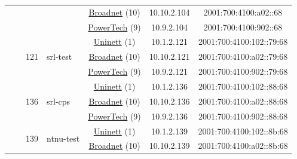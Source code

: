 \begin{small}
\begin{center}
\begin{longtable}{|c|c|c|c|c|c|c|c|}
  &  & \multicolumn{2}{|c|}{} & \multicolumn{2}{|c|}{\tiny{\href{https://www.broadnet.no}{Broadnet} (10)}} & \tiny{10.10.2.104} & \tiny{2001:700:4100:a02::68} \\* \cline{5-5}\cline{6-6}\cline{7-7}\cline{8-8}
  &  & \multicolumn{2}{|c|}{} & \multicolumn{2}{|c|}{\tiny{\href{http://www.powertech.no}{PowerTech} (9)}} & \tiny{10.9.2.104} & \tiny{2001:700:4100:902::68} \\* \cline{3-3}\cline{4-4}\cline{5-5}\cline{6-6}\cline{7-7}\cline{8-8}
  &  & \multirow{3}{*}{\tiny{121}} & \multicolumn{1}{|l|}{\multirow{3}{*}{\tiny{srl-test}}} & \multicolumn{2}{|c|}{\tiny{\href{https://www.uninett.no}{Uninett} (1)}} & \tiny{10.1.2.121} & \tiny{2001:700:4100:102::79:68} \\* \cline{5-5}\cline{6-6}\cline{7-7}\cline{8-8}
  &  &  &  & \multicolumn{2}{|c|}{\tiny{\href{https://www.broadnet.no}{Broadnet} (10)}} & \tiny{10.10.2.121} & \tiny{2001:700:4100:a02::79:68} \\* \cline{5-5}\cline{6-6}\cline{7-7}\cline{8-8}
  &  &  &  & \multicolumn{2}{|c|}{\tiny{\href{http://www.powertech.no}{PowerTech} (9)}} & \tiny{10.9.2.121} & \tiny{2001:700:4100:902::79:68} \\* \cline{3-3}\cline{4-4}\cline{5-5}\cline{6-6}\cline{7-7}\cline{8-8}
  &  & \multirow{3}{*}{\tiny{136}} & \multicolumn{1}{|l|}{\multirow{3}{*}{\tiny{srl-cps}}} & \multicolumn{2}{|c|}{\tiny{\href{https://www.uninett.no}{Uninett} (1)}} & \tiny{10.1.2.136} & \tiny{2001:700:4100:102::88:68} \\* \cline{5-5}\cline{6-6}\cline{7-7}\cline{8-8}
  &  &  &  & \multicolumn{2}{|c|}{\tiny{\href{https://www.broadnet.no}{Broadnet} (10)}} & \tiny{10.10.2.136} & \tiny{2001:700:4100:a02::88:68} \\* \cline{5-5}\cline{6-6}\cline{7-7}\cline{8-8}
  &  &  &  & \multicolumn{2}{|c|}{\tiny{\href{http://www.powertech.no}{PowerTech} (9)}} & \tiny{10.9.2.136} & \tiny{2001:700:4100:902::88:68} \\* \cline{3-3}\cline{4-4}\cline{5-5}\cline{6-6}\cline{7-7}\cline{8-8}
  &  & \multirow{3}{*}{\tiny{139}} & \multicolumn{1}{|l|}{\multirow{3}{*}{\tiny{ntnu-test}}} & \multicolumn{2}{|c|}{\tiny{\href{https://www.uninett.no}{Uninett} (1)}} & \tiny{10.1.2.139} & \tiny{2001:700:4100:102::8b:68} \\* \cline{5-5}\cline{6-6}\cline{7-7}\cline{8-8}
  &  &  &  & \multicolumn{2}{|c|}{\tiny{\href{https://www.broadnet.no}{Broadnet} (10)}} & \tiny{10.10.2.139} & \tiny{2001:700:4100:a02::8b:68} \\* \cline{5-5}\cline{6-6}\cline{7-7}\cline{8-8}

\end{longtable}
\end{center}
\end{small}
